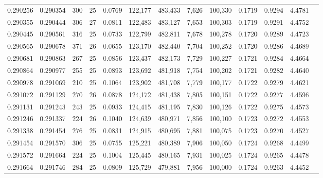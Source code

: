 \begin{tabular}{rrrrrrrrrrrrr}
0.290256 & 0.290354 &   300 &  25 &                                     0.0769 & 122,177 & 483,433 &   7,626 & 100,330 & 0.1719 & 0.9294 & 4.4781 \\
0.290355 & 0.290444 &   306 &  27 &                                     0.0811 & 122,483 & 483,127 &   7,653 & 100,303 & 0.1719 & 0.9291 & 4.4752 \\
0.290445 & 0.290561 &   316 &  25 &                                     0.0733 & 122,799 & 482,811 &   7,678 & 100,278 & 0.1720 & 0.9289 & 4.4723 \\
0.290565 & 0.290678 &   371 &  26 &                                     0.0655 & 123,170 & 482,440 &   7,704 & 100,252 & 0.1720 & 0.9286 & 4.4689 \\
0.290681 & 0.290863 &   267 &  25 &                                     0.0856 & 123,437 & 482,173 &   7,729 & 100,227 & 0.1721 & 0.9284 & 4.4664 \\
0.290864 & 0.290977 &   255 &  25 &                                     0.0893 & 123,692 & 481,918 &   7,754 & 100,202 & 0.1721 & 0.9282 & 4.4640 \\
0.290978 & 0.291069 &   210 &  25 &                                     0.1064 & 123,902 & 481,708 &   7,779 & 100,177 & 0.1722 & 0.9279 & 4.4621 \\
0.291072 & 0.291129 &   270 &  26 &                                     0.0878 & 124,172 & 481,438 &   7,805 & 100,151 & 0.1722 & 0.9277 & 4.4596 \\
0.291131 & 0.291243 &   243 &  25 &                                     0.0933 & 124,415 & 481,195 &   7,830 & 100,126 & 0.1722 & 0.9275 & 4.4573 \\
0.291246 & 0.291337 &   224 &  26 &                                     0.1040 & 124,639 & 480,971 &   7,856 & 100,100 & 0.1723 & 0.9272 & 4.4553 \\
0.291338 & 0.291454 &   276 &  25 &                                     0.0831 & 124,915 & 480,695 &   7,881 & 100,075 & 0.1723 & 0.9270 & 4.4527 \\
0.291454 & 0.291570 &   306 &  25 &                                     0.0755 & 125,221 & 480,389 &   7,906 & 100,050 & 0.1724 & 0.9268 & 4.4499 \\
0.291572 & 0.291664 &   224 &  25 &                                     0.1004 & 125,445 & 480,165 &   7,931 & 100,025 & 0.1724 & 0.9265 & 4.4478 \\
0.291664 & 0.291746 &   284 &  25 &                                     0.0809 & 125,729 & 479,881 &   7,956 & 100,000 & 0.1724 & 0.9263 & 4.4452 \\

\end{tabular}
